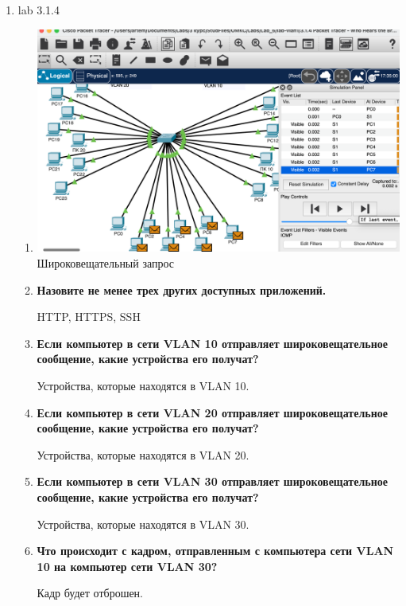 \documentclass[a4paper,14pt]{extarticle}
\begin{document}
    \begin{enumerate}
        \item lab 3.1.4
        \begin{enumerate}
            \item
                \begin{center}
                    \includegraphics[scale=0.4]{pics/3.1.4_1.png} 
                    Широковещательный запрос
                \end{center} 

            \item \textbf{Назовите не менее трех других доступных приложений.}\par
            HTTP, HTTPS, SSH

            \item \textbf{Если компьютер в сети VLAN 10 отправляет широковещательное сообщение, какие устройства его получат?}\par
            Устройства, которые находятся в VLAN 10.

            \item \textbf{Если компьютер в сети VLAN 20 отправляет широковещательное сообщение, какие устройства его получат?}\par
            Устройства, которые находятся в VLAN 20.

            \item \textbf{Если компьютер в сети VLAN 30 отправляет широковещательное сообщение, какие устройства его получат?}\par
            Устройства, которые находятся в VLAN 30.

            \item \textbf{Что происходит с кадром, отправленным с компьютера сети VLAN 10 на компьютер сети VLAN 30?}\par
            Кадр будет отброшен.


\end{enumerate}
\end{enumerate}
\end{document}
